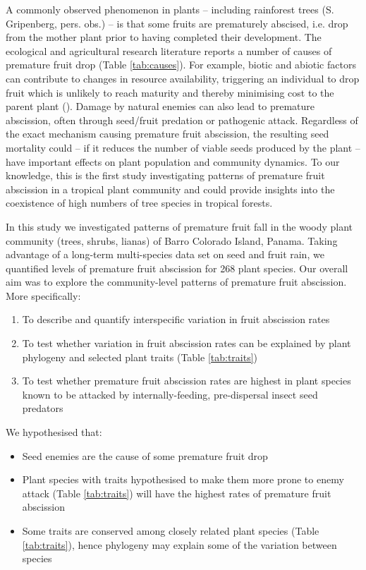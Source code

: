 A commonly observed phenomenon in plants – including rainforest trees (S. Gripenberg, pers. obs.) – is that some fruits are prematurely abscised, i.e. drop from the mother plant prior to having completed their development. The ecological and agricultural research literature reports a number of causes of premature fruit drop (Table \ref{tab:causes}). For example, biotic and abiotic factors can contribute to changes in resource availability, triggering an individual to drop fruit which is unlikely to reach maturity and thereby minimising cost to the parent plant (\cite{stephensonFlowerFruitAbortion1981}). Damage by natural enemies can also lead to premature abscission, often through seed/fruit predation or pathogenic attack. Regardless of the exact mechanism causing premature fruit abscission, the resulting seed mortality could – if it reduces the number of viable seeds produced by the plant – have important effects on plant population and community dynamics. To our knowledge, this is the first study investigating patterns of premature fruit abscission in a tropical plant community and could provide insights into the coexistence of high numbers of tree species in tropical forests.

In this study we investigated patterns of premature fruit fall in the woody plant community (trees, shrubs, lianas) of Barro Colorado Island, Panama. Taking advantage of a long-term multi-species data set on seed and fruit rain, we quantified levels of premature fruit abscission for 268 plant species. Our overall aim was to explore the community-level patterns of premature fruit abscission. More specifically:

\begin{enumerate}
\item To describe and quantify interspecific variation in fruit abscission rates
\item To test whether variation in fruit abscission rates can be explained by plant phylogeny and selected plant traits (Table \ref{tab:traits})
\item To test whether premature fruit abscission rates are highest in plant species known to be attacked by internally-feeding, pre-dispersal insect seed predators
\end{enumerate} 

We hypothesised that:
\begin{itemize}
\item Seed enemies are the cause of some premature fruit drop
\item Plant species with traits hypothesised to make them more prone to enemy attack (Table \ref{tab:traits}) will have the highest rates of premature fruit abscission
\item Some traits are conserved among closely related plant species (Table \ref{tab:traits}), hence phylogeny may explain some of the variation between species 
\end{itemize}

